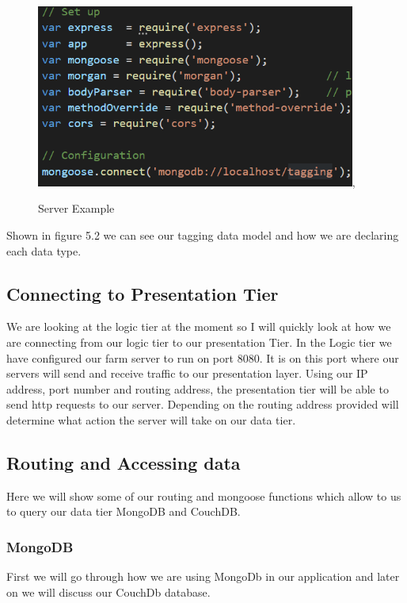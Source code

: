 \documentclass[12pt,a4paper,oneside,openany]{book}
\begin{document}
\begin{figure}[ht]
\renewcommand\thefigure{5.3}
\centering
\includegraphics[width=10.5cm,height=6cm]{Images/setup.png},
\caption{Server Example}
\label{setup}
\end{figure}

Shown in figure 5.2 we can see our tagging data model and how we are declaring each data type.

\subsection{Connecting to Presentation Tier}
We are looking at the logic tier at the moment so I will quickly look at how we are connecting from our logic tier to our presentation Tier. In the Logic tier we have conﬁgured our farm server to run on port 8080. It is on this port where our servers will send and receive traffic to our presentation layer. Using our IP address, port number and routing address, the presentation tier will be able to send http requests to our server. Depending on the routing address provided will determine what action the server will take on our data tier.
\\

\newpage

\subsection{Routing and Accessing data}
Here we will show some of our routing and mongoose functions which allow to us to query our data tier MongoDB and CouchDB. 

\subsubsection{MongoDB}
First we will go through how we are using MongoDb in our application and later on we will discuss our CouchDb database.\\
\end{document}
